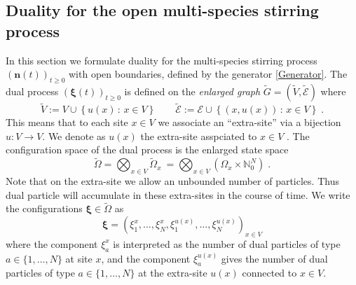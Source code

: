 \documentclass[10pt]{article}
\numberwithin{equation}{section}
\numberwithin{equation}{subsection}
\newcommand{\dt}{\;.}
\begin{document}
\subsection{Duality for the open multi-species stirring process}\label{statementDualitySubsection}
In this section we formulate duality for the multi-species stirring process $(\bm{n}(t))_{t\geq 0}$ with open boundaries, defined by the generator \eqref{Generator}.
The dual  process $(\bm{\xi}(t))_{t\geq 0}$ is defined on the \textit{enlarged graph} $\widetilde{G}=(\widetilde{V},\widetilde{\mathcal{E}})$ where 
\begin{equation}
	\widetilde{V}:=V\cup \left\{u(x)\,:\, x\in V\right\}\qquad \widetilde{\mathcal{E}}:=\mathcal{E}\cup \left\{(x,u(x))\,:\, x\in V\right\}\dt
\end{equation}
This means that to each site $x\in V$ we associate an ``extra-site'' via a bijection $u:V\to V$. We denote as $u(x)$ the extra-site asspciated to $x\in V$ . The configuration space of the dual process is the enlarged state space
\begin{equation}\label{dualStateSpace}
    \widetilde{\Omega}= \bigotimes_{x\in V} \widetilde{\Omega}_{x}\ = \bigotimes_{x\in V} (\Omega_{x}\times \mathbb{N}_{0}^{N})\dt
\end{equation}
Note that on the extra-site we allow an unbounded number of particles. Thus
dual particle will accumulate in these extra-sites in the course of time. 
We write the configurations $\bm{\xi} \in \widetilde\Omega$  as
\begin{equation}
    \bm{\xi}=\left(\xi_{1}^{x},\ldots,\xi_{N}^{x},\xi_{1}^{u(x)},\ldots,\xi_{N}^{u(x)}\right)_{x\in V}
\end{equation}
where the component $\xi_{a}^{x}$ is interpreted as the number of dual particles of type $a\in \{1,\ldots,N\}$ at site $x$, 
and the component $\xi_{a}^{u(x)}$  gives the number of dual particles of type $a\in \{1,\ldots,N\}$ at 
the extra-site $u(x)$ connected to $x\in V$.
\end{document}
